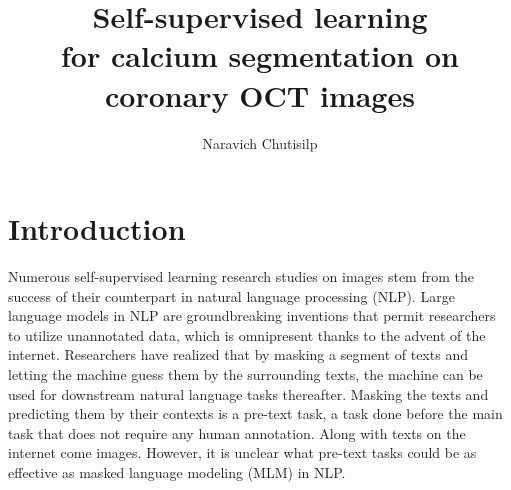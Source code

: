 \documentclass[a4paper,11pt,oneside]{report}
\title{Self-supervised learning\\for calcium segmentation on coronary OCT images}
\author{Naravich Chutisilp}
\begin{document}
\maketitle
\makededication
\makeacks

\begin{abstract}


\end{abstract}


\maketoc

\chapter{Introduction}



Numerous self-supervised learning research studies on images stem from the success of their counterpart in natural language processing (NLP). Large language models in NLP are groundbreaking inventions that permit researchers to utilize unannotated data, which is omnipresent thanks to the advent of the internet. Researchers have realized that by masking a segment of texts and letting the machine guess them by the surrounding texts, the machine can be used for downstream natural language tasks thereafter. Masking the texts and predicting them by their contexts is a pre-text task, a task done before the main task that does not require any human annotation. Along with texts on the internet come images. However, it is unclear what pre-text tasks could be as effective as masked language modeling (MLM) in NLP. 
\end{document}
